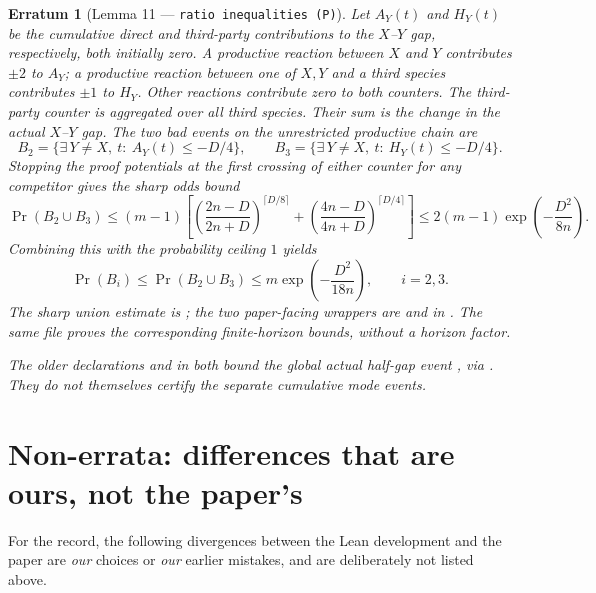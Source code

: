 \documentclass[11pt]{article}
\theoremstyle{erratumstyle}
\newtheorem{erratum}{Erratum}
\begin{document}
\begin{erratum}[Lemma 11 --- \texttt{ratio inequalities (P)}]
Let $A_Y(t)$ and $H_Y(t)$ be the cumulative direct and third-party
contributions to the $X$--$Y$ gap, respectively, both initially zero.
A productive reaction between $X$ and $Y$ contributes $\pm2$ to $A_Y$;
a productive reaction between one of $X,Y$ and a third species contributes
$\pm1$ to $H_Y$. Other reactions contribute zero to both counters.
The third-party counter is aggregated over all third species.
Their sum is the change in the actual $X$--$Y$ gap. The two
bad events on the unrestricted productive chain are
\[
  B_2=\{\exists\,Y\ne X,\ t:\ A_Y(t)\le-D/4\},\qquad
  B_3=\{\exists\,Y\ne X,\ t:\ H_Y(t)\le-D/4\}.
\]
Stopping the proof potentials at the first crossing of either counter
for any competitor gives the sharp odds bound
\[
 \Pr(B_2\cup B_3)\le
 (m-1)\left[
   \left(\frac{2n-D}{2n+D}\right)^{\lceil D/8\rceil}
   +
   \left(\frac{4n-D}{4n+D}\right)^{\lceil D/4\rceil}
 \right]
 \le 2(m-1)\exp\!\left(-\frac{D^2}{8n}\right).
\]
Combining this with the probability ceiling $1$ yields
\[
  \Pr(B_i)\le\Pr(B_2\cup B_3)
    \le m\exp\!\left(-\frac{D^2}{18n}\right),
  \qquad i=2,3.
\]
The sharp union estimate is
;
the two paper-facing wrappers are
 and
 in
. The same file proves the
corresponding finite-horizon bounds, without a horizon factor.

The older declarations
 and
 in
 both bound the global actual half-gap event
, via
. They do not
themselves certify the separate cumulative mode events.
\end{erratum}

\section*{Non-errata: differences that are ours, not the paper's}

For the record, the following divergences between the Lean development and the
paper are \emph{our} choices or \emph{our} earlier mistakes, and are
deliberately not listed above.
\end{document}
